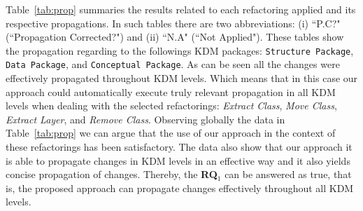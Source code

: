 Table~\ref{tab:prop} summaries the results related to each refactoring applied and its respective propagations. In such tables there are two abbreviations: (i) ``P.C?" (``Propagation Corrected?") and (ii) ``N.A" (``Not Applied"). %
These tables show the propagation regarding to the followings KDM packages: \texttt{Structure Package}, \texttt{Data Package}, and \texttt{Conceptual Package}. As can be seen all the changes were effectively propagated throughout KDM levels. Which means that in this case our approach could automatically execute truly relevant propagation in all KDM levels when dealing with the selected refactorings: \textit{Extract Class}, \textit{Move Class}, \textit{Extract Layer}, and \textit{Remove Class}. Observing globally the data in Table~\ref{tab:prop} we can argue that the use of our approach in the context of these refactorings has been satisfactory. The data also show that our approach it is able to propagate changes in KDM levels in an effective way and it also yields concise propagation of changes. Thereby, the \textbf{RQ$_1$} can be answered as true, that is, the proposed approach can propagate changes effectively throughout all KDM levels.















